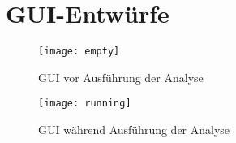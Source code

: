 
\section{GUI-Entwürfe}

\begin{figure}[H]
\caption{GUI vor Ausführung der Analyse}
\centering
\texttt{[image: empty]}
\end{figure}

\begin{figure}[H]
\caption{GUI während Ausführung der Analyse}
\centering
\texttt{[image: running]}
\end{figure}